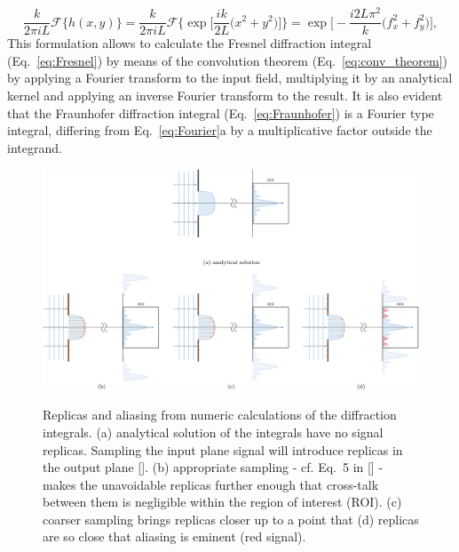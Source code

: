 \begin{refsection}
\begin{equation}\label{eq:kernel}
     \frac{k}{2\pi i L}\mathcal{F}\{h(x,y)\} = \frac{k}{2\pi i L}\mathcal{F}\Bigg\{
    \exp\bigg[\frac{ik}{2L}\big(x^2+y^2 \big)\bigg]\Bigg\} = \exp{\bigg[-\frac{i2L\pi^2}{k} \big(f_x^2+f_y^2 \big)\bigg]},
\end{equation}
This formulation allows to calculate the Fresnel diffraction integral (Eq.~\ref{eq:Fresnel}) by means of the convolution theorem (Eq.~\ref{eq:conv_theorem}) by applying a Fourier transform to the input field, multiplying it by an analytical kernel and applying an inverse Fourier transform to the result. It is also evident that the Fraunhofer diffraction integral (Eq.~\ref{eq:Fraunhofer}) is a Fourier type integral, differing from Eq.~\ref{eq:Fourier}a by a multiplicative factor outside the integrand. 

\begin{figure}[t]
    \centering
    {\includegraphics[width=1\linewidth]{figures/ch02/sampling_aliasing.pdf}}
    \caption[Replicas and aliasing]{Replicas and aliasing from numeric calculations of the diffraction integrals. (a) analytical solution of the integrals have no signal replicas. Sampling the input plane signal will introduce replicas in the output plane [\cite{Kelly2014}]. (b) appropriate sampling - cf. Eq.~5 in [\cite{Chubar2019}] - makes the unavoidable replicas further enough that cross-talk between them is negligible within the region of interest (ROI). (c) coarser sampling brings replicas closer up to a point that (d) replicas are so close that aliasing is eminent (red signal).}
    \label{fig:sampling}
\end{figure}


\end{refsection}

